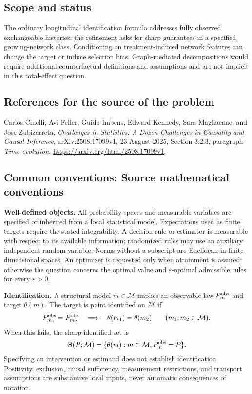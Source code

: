 \documentclass[11pt,a4paper]{article}
\begin{document}
\subsection*{Scope and status}
The ordinary longitudinal identification formula addresses fully observed exchangeable histories; the refinement asks for sharp guarantees in a specified growing-network class. Conditioning on treatment-induced network features can change the target or induce selection bias. Graph-mediated decompositions would require additional counterfactual definitions and assumptions and are not implicit in this total-effect question.
\subsection*{References for the source of the problem}
Carlos Cinelli, Avi Feller, Guido Imbens, Edward Kennedy, Sara Magliacane, and Jose Zubizarreta, \emph{Challenges in Statistics: A Dozen Challenges in Causality and Causal Inference}, arXiv:2508.17099v1, 23 August 2025, Section 3.2.3, paragraph \emph{Time evolution}. \url{https://arxiv.org/html/2508.17099v1}.

\subsection*{Common conventions: Source mathematical conventions}

\textbf{Well-defined objects.}
All probability spaces and measurable variables are specified or inherited
from a local statistical model. Expectations used as finite targets require
the stated integrability. A decision rule or estimator is measurable with
respect to its available information; randomized rules may use an auxiliary
independent random variable. Norms without a subscript are Euclidean in
finite-dimensional spaces. An optimizer is requested only when attainment
is assured; otherwise the question concerns the optimal value and
$\varepsilon$-optimal admissible rules for every $\varepsilon>0$.

\textbf{Identification.}
A structural model $m\in\mathcal M$ implies an observable law
$P_m^{\rm obs}$ and target $\theta(m)$. The target is point identified on
$\mathcal M$ if
\[
 P_{m_1}^{\rm obs}=P_{m_2}^{\rm obs}
 \quad\Longrightarrow\quad\theta(m_1)=\theta(m_2)
 \qquad(m_1,m_2\in\mathcal M).
\]
When this fails, the sharp identified set is
\[
 \Theta(P;\mathcal M)=\{\theta(m):m\in\mathcal M,
                                  P_m^{\rm obs}=P\}.
\]
Specifying an intervention or estimand does not establish identification.
Positivity, exclusion, causal sufficiency, measurement restrictions, and
transport assumptions are substantive local inputs, never automatic
consequences of notation.
\end{document}
